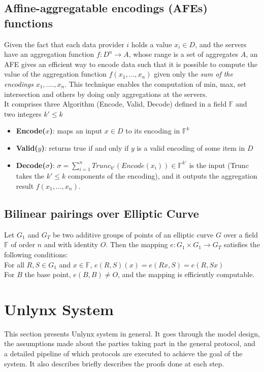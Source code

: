 \documentclass{article}
\begin{document}
\subsection*{Affine-aggregatable encodings (AFEs) functions}
\label{afe}
Given the fact that each data provider $i$ holds a value $x_i \in D$, and the servers have an aggregation function $f : D^n \rightarrow A$, whose range is a set of aggregates $A$, an AFE gives an efficient way to encode data such that it is possible to compute the value of the aggregation function $f(x_1,...,x_n)$ given only the \textit{sum of the encodings} $x_1,....,x_n$. This technique enables the computation of min, max, set intersection and others by doing only aggregations at the servers.\\
It comprises three Algorithm (Encode, Valid, Decode) defined in a field $\mathbb{F}$ and two integers $k' \leq k$\\
\begin{itemize}
\item \textbf{Encode($x$)}: maps an input $x \in D$ to its encoding in $\mathbb{F}^k$
\item \textbf{Valid($y$)}: returns true if and only if $y$ is a valid encoding of some item in $D$
\item \textbf{Decode($\sigma$)}: $\sigma = \sum_{i=1}^{n}{Trunc_{k'}(Encode(x_i))} \in \mathbb{F}^{k'}$ is the input (Trunc takes the $k' \leq k$ components of the encoding), and it outputs the aggregation result $f(x_1,...,x_n)$.
\end{itemize}

\subsection*{Bilinear pairings over Elliptic Curve}
Let $G_1$ and $G_T$ be two additive groups of points of an elliptic curve $G$ over a field $\mathbb{F}$ of order $n$ and with identity $O$. Then the mapping $e: G_1 \times G_1 \rightarrow G_T$ satisfies the following conditions:\\
For all $R,S \in G_1$ and $x \in \mathbb{F}$, $e(R,S)(x) = e(Rx,S) = e(R,Sx)$\\
For $B$ the base point, $e(B,B) \neq O$, and the mapping is efficiently computable.


\section{Unlynx System}
This section presents Unlynx \cite{unlynx} system in general. It goes through the model design, the assumptions made about the parties taking part in the general protocol, and a detailed pipeline of which protocols are executed to achieve the goal of the system. It also describes briefly describes the proofs done at each step.\\
\end{document}
